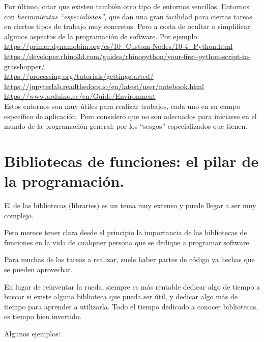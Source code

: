 \documentclass[spanish,12pt,a4paper,final,oneside]{book}
\begin{document}
\vspace{0.3cm}
Por último, citar que existen también otro tipo de entornos sencillos. Entornos con \textit{herramientas ``especialistas''}, que dan una gran facilidad para ciertas tareas en ciertos tipos de trabajo muy concretos. Pero a costa de ocultar o simplificar algunos aspectos de la programación de software. Por ejemplo:
\\ \url{https://primer.dynamobim.org/es/10_Custom-Nodes/10-4_Python.html}
\\ \url{https://developer.rhino3d.com/guides/rhinopython/your-first-python-script-in-grasshopper/}
\\ \url{https://processing.org/tutorials/gettingstarted/}
\\ \url{https://jupyterlab.readthedocs.io/en/latest/user/notebook.html}
\\ \url{https://www.arduino.cc/en/Guide/Environment}
\\Estos entornos son muy útiles para realizar trabajos, cada uno en su campo específico de aplicación. Pero considero que no son adecuados para iniciarse en el mundo de la programación general; por los ``sesgos'' especializados que tienen.



\chapter{Bibliotecas de funciones: el pilar de la programación.} \label{la_importancia_de_las_bibliotecas} 

El de las bibliotecas (libraries) es un tema muy extenso y puede llegar a ser muy complejo.

Pero merece tener clara desde el principio la importancia de las bibliotecas de funciones en la vida de cualquier persona que se dedique a programar software.

Para muchas de las tareas a realizar, suele haber partes de código ya hechas que se pueden aprovechar.

En lugar de reinventar la rueda, siempre es más rentable dedicar algo de tiempo a buscar si existe alguna biblioteca que pueda ser útil, y dedicar algo más de tiempo para aprender a utilizarla. Todo el tiempo dedicado a conocer bibliotecas, es tiempo bien invertido.


\vspace{0.3cm}
Algunos ejemplos:
\end{document}
